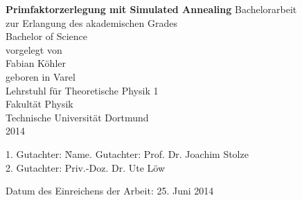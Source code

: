 \thispagestyle{empty}

\thispagestyle{empty}
\begin{center}
  \vspace*{\fill}
  \huge\textbf{Primfaktorzerlegung mit Simulated Annealing}
  \vfill
  \vfill
  \Large
  Bachelorarbeit \\
  zur Erlangung des akademischen Grades
  \\ Bachelor of Science \\[20pt]
  \normalsize
  vorgelegt von \\[5pt]
  {\Large Fabian Köhler} \\[5pt]
  geboren in Varel \\
  \vspace{20pt}
  Lehrstuhl für Theoretische Physik 1 \\
  Fakultät Physik \\
  Technische Universität Dortmund \\
  2014
\end{center}
\newpage

  \thispagestyle{empty}
		\vspace*{\fill}
		\begin{tabbing}
				1. Gutachter: \=Name. Gutachter: \>Prof. Dr. Joachim Stolze\\[10pt]
				2. Gutachter: \>Priv.-Doz. Dr. Ute Löw
		\end{tabbing}
		\vspace{20pt}
		Datum des Einreichens der Arbeit: 25. Juni 2014
		\newpage


\newpage

\thispagestyle{empty}
\tableofcontents
\newpage

\setcounter{page}{1}
